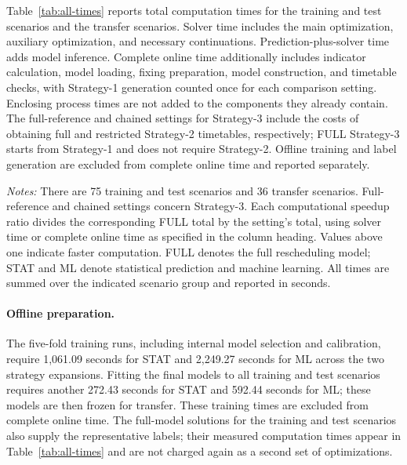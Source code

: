 Table~\ref{tab:all-times} reports total computation times for the training and test scenarios and the transfer scenarios. Solver time includes the main optimization, auxiliary optimization, and necessary continuations. Prediction-plus-solver time adds model inference. Complete online time additionally includes indicator calculation, model loading, fixing preparation, model construction, and timetable checks, with Strategy-1 generation counted once for each comparison setting. Enclosing process times are not added to the components they already contain. The full-reference and chained settings for Strategy-3 include the costs of obtaining full and restricted Strategy-2 timetables, respectively; FULL Strategy-3 starts from Strategy-1 and does not require Strategy-2. Offline training and label generation are excluded from complete online time and reported separately.

\begin{table}[htbp]
\centering
\caption{Computation time by scenario group and comparison setting}
\label{tab:all-times}

\par\vspace{3pt}
\begin{minipage}{\linewidth}\footnotesize
\textit{Notes:} There are 75 training and test scenarios and 36 transfer scenarios. Full-reference and chained settings concern Strategy-3. Each computational speedup ratio divides the corresponding FULL total by the setting's total, using solver time or complete online time as specified in the column heading. Values above one indicate faster computation. FULL denotes the full rescheduling model; STAT and ML denote statistical prediction and machine learning. All times are summed over the indicated scenario group and reported in seconds.
\end{minipage}
\end{table}

\paragraph{Offline preparation.}
The five-fold training runs, including internal model selection and calibration, require 1,061.09 seconds for STAT and 2,249.27 seconds for ML across the two strategy expansions. Fitting the final models to all training and test scenarios requires another 272.43 seconds for STAT and 592.44 seconds for ML; these models are then frozen for transfer. These training times are excluded from complete online time. The full-model solutions for the training and test scenarios also supply the representative labels; their measured computation times appear in Table~\ref{tab:all-times} and are not charged again as a second set of optimizations.
